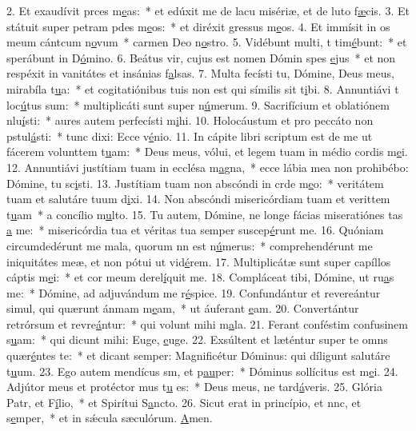 2. Et exaudívit prces m\uline{e}as:~* et edúxit me de lacu misériæ, et de luto f\uline{æ}cis.
3. Et státuit super petram pdes m\uline{e}os:~* et diréxit gressus m\uline{e}os.
4. Et immísit in os meum cántcum n\uline{o}vum~* carmen Deo n\uline{o}stro.
5. Vidébunt multi, t tim\uline{é}bunt:~* et sperábunt in D\uline{ó}mino.
6. Beátus vir, cujus est nomen Dómin spes \uline{e}jus~* et non respéxit in vanitátes et insánias f\uline{a}lsas.
7. Multa fecísti tu, Dómine, Deus meus, mirabíla t\uline{u}a:~* et cogitatiónibus tuis non est qui símilis sit t\uline{i}bi.
8. Annuntiávi t loc\uline{ú}tus sum:~* multiplicáti sunt super n\uline{ú}merum.
9. Sacrifícium et oblatiónem nlu\uline{í}sti:~* aures autem perfecísti m\uline{i}hi.
10. Holocáustum et pro peccáto non pstul\uline{á}sti:~* tunc dixi: Ecce v\uline{é}nio.
11. In cápite libri scriptum est de me ut fácerem volunttem t\uline{u}am:~* Deus meus, vólui, et legem tuam in médio cordis m\uline{e}i.
12. Annuntiávi justítiam tuam in ecclésa m\uline{a}gna,~* ecce lábia mea non prohibébo: Dómine, tu sc\uline{i}sti.
13. Justítiam tuam non abscóndi in crde m\uline{e}o:~* veritátem tuam et salutáre tuum d\uline{i}xi.
14. Non abscóndi misericórdiam tuam et verittem t\uline{u}am~* a concílio m\uline{u}lto.
15. Tu autem, Dómine, ne longe fácias miseratiónes tas \uline{a} me:~* misericórdia tua et véritas tua semper suscep\uline{é}runt me.
16. Quóniam circumdedérunt me mala, quorum nn est n\uline{ú}merus:~* comprehendérunt me iniquitátes meæ, et non pótui ut vid\uline{é}rem.
17. Multiplicátæ sunt super capíllos cáptis m\uline{e}i:~* et cor meum derel\uline{í}quit me.
18. Compláceat tibi, Dómine, ut ru\uline{a}s me:~* Dómine, ad adjuvándum me r\uline{é}spice.
19. Confundántur et revereántur simul, qui quærunt ánmam m\uline{e}am,~* ut áuferant \uline{e}am.
20. Convertántur retrórsum et revre\uline{á}ntur:~* qui volunt mihi m\uline{a}la.
21. Ferant conféstim confusinem s\uline{u}am:~* qui dicunt mihi: Euge, \uline{e}uge.
22. Exsúltent et læténtur super te omns quær\uline{é}ntes te:~* et dicant semper: Magnificétur Dóminus: qui díligunt salutáre t\uline{u}um.
23. Ego autem mendícus sm, et p\uline{au}per:~* Dóminus sollícitus est m\uline{e}i.
24. Adjútor meus et protéctor mus t\uline{u} es:~* Deus meus, ne tard\uline{á}veris.
25. Glória Patr, et F\uline{í}lio,~* et Spirítui S\uline{a}ncto.
26. Sicut erat in princípio, et nnc, et s\uline{e}mper,~* et in sǽcula sæculórum. \uline{A}men.
